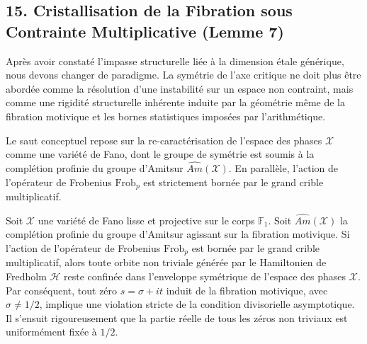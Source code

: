 \documentclass[
]{article}
\begin{document}
\subsection{15. Cristallisation de la Fibration sous Contrainte Multiplicative (Lemme 7)}
Après avoir constaté l'impasse structurelle liée à la dimension étale générique, nous devons changer de paradigme. La symétrie de l'axe critique ne doit plus être abordée comme la résolution d'une instabilité sur un espace non contraint, mais comme une rigidité structurelle inhérente induite par la géométrie même de la fibration motivique et les bornes statistiques imposées par l'arithmétique.

Le saut conceptuel repose sur la re-caractérisation de l'espace des phases $\mathcal{X}$ comme une variété de Fano, dont le groupe de symétrie est soumis à la complétion profinie du groupe d'Amitsur $\widehat{Am}(\mathcal{X})$. En parallèle, l'action de l'opérateur de Frobenius $\mathrm{Frob}_p$ est strictement bornée par le grand crible multiplicatif.

\begin{lemme}
    Soit $\mathcal{X}$ une variété de Fano lisse et projective sur le corps $\mathbb{F}_1$. Soit $\widehat{Am}(\mathcal{X})$ la complétion profinie du groupe d'Amitsur agissant sur la fibration motivique. Si l'action de l'opérateur de Frobenius $\mathrm{Frob}_p$ est bornée par le grand crible multiplicatif, alors toute orbite non triviale générée par le Hamiltonien de Fredholm $\mathcal{H}$ reste confinée dans l'enveloppe symétrique de l'espace des phases $\mathcal{X}$. Par conséquent, tout zéro $s = \sigma + it$ induit de la fibration motivique, avec $\sigma \neq 1/2$, implique une violation stricte de la condition divisorielle asymptotique. Il s'ensuit rigoureusement que la partie réelle de tous les zéros non triviaux est uniformément fixée à $1/2$.
\end{lemme}
\end{document}
